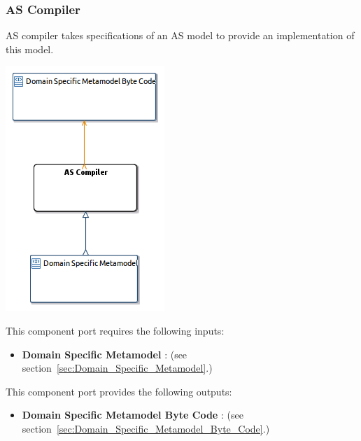 \documentclass{gemoc} %
\begin{document}
\subsubsection{AS Compiler}
\label{sec:AS_Compiler}
AS compiler takes specifications of an AS model to provide an implementation of this model.
\begin{center}
\includegraphics*[trim=0.0cm 0.0cm 0cm 0.0cm, clip=true]{../images/generated/Generated_AS_Compiler.png}
\end{center}

This component port requires the following inputs:
\begin{itemize}
  \item \textbf{Domain Specific Metamodel} :
(see section~\ref{sec:Domain_Specific_Metamodel}.)
\end{itemize}

This component port provides the following outputs:
\begin{itemize}
  \item \textbf{Domain Specific Metamodel Byte Code} :
(see section~\ref{sec:Domain_Specific_Metamodel_Byte_Code}.)
\end{itemize}
\end{document}
